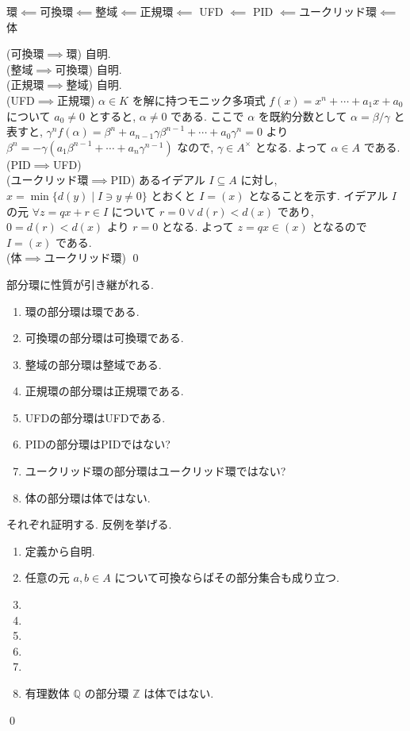 \documentclass[uplatex,dvipdfmx,a4paper,11pt]{jlreq}
\makeatletter
\theoremstyle{definition}
\renewenvironment{proof}[1][\proofname]{\par
  \normalfont
  \topsep6\p@\@plus6\p@ \trivlist
  \item[\hskip\labelsep{\bfseries #1}\@addpunct{\bfseries}]\ignorespaces\quad\par
}{%
  \qed\endtrivlist\@endpefalse
}
\renewcommand\proofname{証明}
\makeatother
\begin{document}
\begin{theorem}[環の鎖]
  環$\impliedby$可換環$\impliedby$整域$\impliedby$正規環$\impliedby$ UFD $\impliedby$ PID $\impliedby$ユークリッド環$\impliedby$体
\end{theorem}
\begin{proof}
  (可換環$\implies$環) 自明. \\
  (整域$\implies$可換環) 自明. \\
  (正規環$\implies$整域) 自明. \\
  (UFD$\implies$正規環) $\alpha\in K$ を解に持つモニック多項式 $f(x) = x^n+\cdots+a_1x + a_0$ について $a_0 \neq 0$ とすると, $\alpha \neq 0$ である. ここで $\alpha$ を既約分数として $\alpha = \beta/\gamma$ と表すと, $\gamma^nf(\alpha) = \beta^n + a_{n-1}\gamma\beta^{n-1} + \cdots + a_0\gamma^n = 0$ より $\beta^n = -\gamma(a_1\beta^{n-1} + \cdots + a_n\gamma^{n-1})$ なので, $\gamma\in A^\times$ となる. よって $\alpha\in A$ である. \\
  (PID$\implies$UFD) \\
  (ユークリッド環$\implies$PID) あるイデアル $I\subseteq A$ に対し, $x = \min\lbrace d(y)\mid I\ni y \neq 0\rbrace$ とおくと $I = (x)$ となることを示す. イデアル $I$ の元 $\forall z=qx+r\in I$ について $r=0\lor d(r)<d(x)$ であり, $0 = d(r) < d(x)$ より $r = 0$ となる. よって $z = qx \in (x)$ となるので $I = (x)$ である. \\
  (体$\implies$ユークリッド環)
\end{proof}


\begin{proposition}
  部分環に性質が引き継がれる.
  \begin{enumerate}
    \item 環の部分環は環である.
    \item 可換環の部分環は可換環である.
    \item 整域の部分環は整域である.
    \item 正規環の部分環は正規環である.
    \item UFDの部分環はUFDである.
    \item PIDの部分環はPIDではない?
    \item ユークリッド環の部分環はユークリッド環ではない?
    \item 体の部分環は体ではない.
  \end{enumerate}
\end{proposition}
\begin{proof}
  それぞれ証明する. 反例を挙げる.
  \begin{enumerate}
    \item 定義から自明.
    \item 任意の元 $a,b\in A$ について可換ならばその部分集合も成り立つ.
    \item
    \item
    \item
    \item
    \item
    \item 有理数体 $\mathbb{Q}$ の部分環 $\mathbb{Z}$ は体ではない.
  \end{enumerate}
\end{proof}
\end{document}
